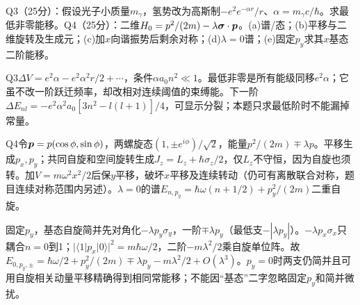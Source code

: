 \begin{exercise}
Q3（25分）：假设光子小质量$m_\gamma$，氢势改为高斯制$-e^2e^{-\alpha r}/r$、$\alpha=m_\gamma c/\hbar$。求最低非零能移。Q4（25分）：二维$H_0=p^2/(2m)-\lambda\boldsymbol{\sigma}\cdot\boldsymbol{p}$。(a)谱/态；(b)平移与二维旋转及生成元；(c)加$x$向谐振势后剩余对称；(d)$\lambda=0$谱；(e)固定$p_y$求其$x$基态二阶能移。
\end{exercise}
\begin{solution}
Q3$\Delta V=e^2\alpha-e^2\alpha^2r/2+\cdots$，条件$\alpha a_0n^2\ll1$。最低非零是所有能级同移$e^2\alpha$；它虽不改一阶跃迁频率，却改相对连续阈值的束缚能。下一阶$\Delta E_{nl}=-e^2\alpha^2a_0[3n^2-l(l+1)]/4$，可显示分裂；本题只求最低阶时不能漏掉常量。

Q4令$\boldsymbol{p}=p(\cos\phi,\sin\phi)$，两螺旋态$(1,\pm e^{i\phi})/\sqrt2$，能量$p^2/(2m)\mp\lambda p$。平移生成$p_x,p_y$；共同自旋和空间旋转生成$J_z=L_z+\hbar\sigma_z/2$，仅$L_z$不守恒，因为自旋也须转。加$V=m\omega^2x^2/2$后保$y$平移，破坏$x$平移及连续转动（仍可有离散联合对称，题目连续对称范围内另述）。$\lambda=0$的谱$E_{n,p_y}=\hbar\omega(n+1/2)+p_y^2/(2m)$二重自旋。

固定$p_y$，基态自旋简并先对角化$-\lambda p_y\sigma_y$，一阶$\mp\lambda p_y$（最低支$-|\lambda p_y|$）。$-\lambda p_x\sigma_x$只耦合$n=0$到1；$|\langle1|p_x|0\rangle|^2=m\hbar\omega/2$，二阶$-m\lambda^2/2$乘自旋单位阵。故$E_{0,p_y,\pm}=\hbar\omega/2+p_y^2/(2m)\mp\lambda p_y-m\lambda^2/2+O(\lambda^3)$。$p_y=0$时两支仍简并且可用自旋相关动量平移精确得到相同常能移；不能因“基态”二字忽略固定$p_y$和简并微扰。
\end{solution}
